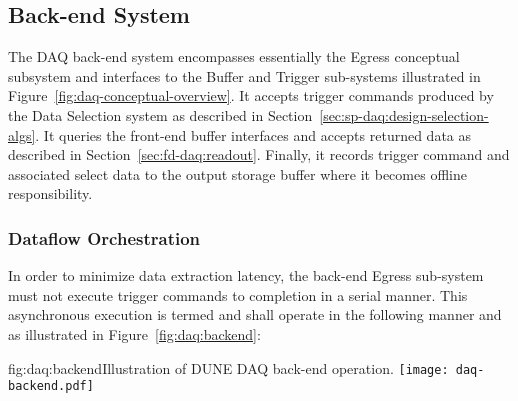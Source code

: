 
 



\subsection{Back-end System}
\label{sec:fd-daq:design-backend}

The DAQ back-end system encompasses essentially the Egress conceptual subsystem and interfaces to the Buffer and Trigger sub-systems illustrated in Figure~\ref{fig:daq-conceptual-overview}. 
It accepts trigger commands produced by the Data Selection system as described in Section~\ref{sec:sp-daq:design-selection-algs}. 
It queries the front-end buffer interfaces and accepts returned data as described in Section~\ref{sec:fd-daq:readout}. 
Finally, it records trigger command and associated select data to the output storage buffer where it becomes offline responsibility.

\subsubsection{Dataflow Orchestration}

In order to minimize data extraction latency, the back-end Egress sub-system must not execute trigger commands to completion in a serial manner. 
This asynchronous execution is termed  and shall operate in the following manner and as illustrated in Figure~\ref{fig:daq:backend}:

\begin{dunefigure}{fig:daq:backend}{Illustration of DUNE DAQ back-end operation.}
  \texttt{[image: daq-backend.pdf]}
\end{dunefigure}

